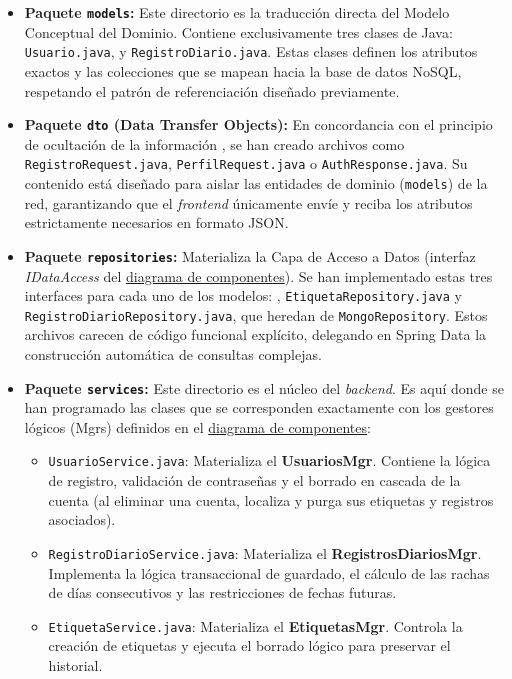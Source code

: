 \begin{itemize}
    \item \textbf{Paquete \texttt{models}:} Este directorio es la traducción directa del Modelo Conceptual del Dominio. Contiene exclusivamente tres clases de Java: \texttt{Usuario.java},  y \texttt{RegistroDiario.java}. Estas clases definen los atributos exactos y las colecciones que se mapean hacia la base de datos NoSQL, respetando el patrón de referenciación diseñado previamente.
    \item \textbf{Paquete \texttt{dto} (Data Transfer Objects):} En concordancia con el principio de ocultación de la información \cite{bib:clean_architecture}, se han creado archivos como \texttt{RegistroRequest.java}, \texttt{PerfilRequest.java} o \texttt{AuthResponse.java}. Su contenido está diseñado para aislar las entidades de dominio (\texttt{models}) de la red, garantizando que el \textit{frontend} únicamente envíe y reciba los atributos estrictamente necesarios en formato JSON.
    \item \textbf{Paquete \texttt{repositories}:} Materializa la Capa de Acceso a Datos (interfaz \textit{IDataAccess} del \hyperref[fig:diagrama_componentes]{diagrama de componentes}). Se han implementado estas tres interfaces para cada uno de los modelos: , \texttt{EtiquetaRepository.java} y \texttt{RegistroDiarioRepository.java}, que heredan de \texttt{MongoRepository}. Estos archivos carecen de código funcional explícito, delegando en Spring Data la construcción automática de consultas complejas.
    \item \textbf{Paquete \texttt{services}:} Este directorio es el núcleo del \textit{backend}. Es aquí donde se han programado las clases que se corresponden exactamente con los gestores lógicos (Mgrs) definidos en el \hyperref[fig:diagrama_componentes]{diagrama de componentes}:
          \begin{itemize}
              \item \texttt{UsuarioService.java}: Materializa el \textbf{UsuariosMgr}. Contiene la lógica de registro, validación de contraseñas y el borrado en cascada de la cuenta (al eliminar una cuenta, localiza y purga sus etiquetas y registros asociados).
              \item \texttt{RegistroDiarioService.java}: Materializa el \textbf{RegistrosDiariosMgr}. Implementa la lógica transaccional de guardado, el cálculo de las rachas de días consecutivos y las restricciones de fechas futuras.
              \item \texttt{EtiquetaService.java}: Materializa el \textbf{EtiquetasMgr}. Controla la creación de etiquetas y ejecuta el borrado lógico para preservar el historial.

\end{itemize}
\end{itemize}
